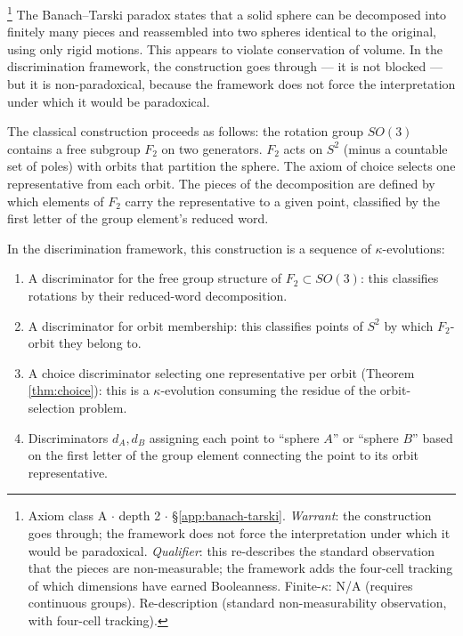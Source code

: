 \begin{example}\footnote{Axiom class \textsf{A} $\cdot$ depth 2 $\cdot$ \S\ref{app:banach-tarski}.  \emph{Warrant}: the construction goes through; the framework does not force the interpretation under which it would be paradoxical. \emph{Qualifier}: this re-describes the standard observation that the pieces are non-measurable; the framework adds the four-cell tracking of which dimensions have earned Booleanness. Finite-$\kappa$: N/A (requires continuous groups). Re-description (standard non-measurability observation, with four-cell tracking).}
\label{ex:banach-tarski}
The Banach--Tarski paradox states that a solid sphere can
be decomposed into finitely many pieces and reassembled
into two spheres identical to the original, using only
rigid motions. This appears to violate conservation of
volume. In the discrimination framework, the construction
goes through --- it is not blocked --- but it is
non-paradoxical, because the framework does not force the
interpretation under which it would be paradoxical.

The classical construction proceeds as follows: the
rotation group $SO(3)$ contains a free subgroup $F_2$ on
two generators. $F_2$ acts on $S^2$ (minus a countable
set of poles) with orbits that partition the sphere. The
axiom of choice selects one representative from each
orbit. The pieces of the decomposition are defined by
which elements of $F_2$ carry the representative to a
given point, classified by the first letter of the
group element's reduced word.

In the discrimination framework, this construction is a
sequence of $\kappa$-evolutions:
\begin{enumerate}[label=(\roman*),nosep]
  \item A discriminator for the free group structure of
    $F_2 \subset SO(3)$: this classifies rotations by
    their reduced-word decomposition.
  \item A discriminator for orbit membership: this
    classifies points of $S^2$ by which $F_2$-orbit
    they belong to.
  \item A choice discriminator selecting one
    representative per orbit (Theorem \ref{thm:choice}):
    this is a $\kappa$-evolution consuming the residue of
    the orbit-selection problem.
  \item Discriminators $d_A, d_B$ assigning each point
    to ``sphere $A$'' or ``sphere $B$'' based on the
    first letter of the group element connecting the
    point to its orbit representative.
\end{enumerate}


\end{example}
